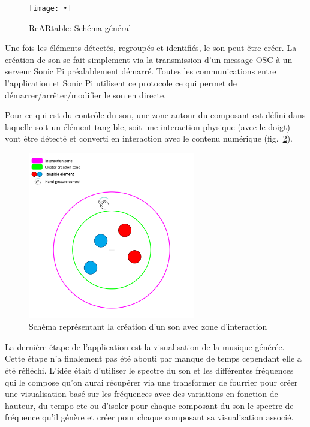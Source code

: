 \begin{figure}[H]
\centering
\caption{ReARtable: Schéma général}
\texttt{[image: •]}
\label{fig:reartable:generalscheme}
\end{figure}

Une fois les éléments détectés, regroupés et identifiés, le son peut être créer. La création de son se fait simplement via la transmission d'un message OSC à un serveur Sonic Pi préalablement démarré. Toutes les communications entre l'application et Sonic Pi utilisent ce protocole ce qui permet de démarrer/arrêter/modifier le son en directe.

Pour ce qui est du contrôle du son, une zone autour du composant est défini dans laquelle soit un élément tangible, soit une interaction physique (avec le doigt) vont être détecté et converti en interaction avec le contenu numérique (fig.~\ref{fig:reartable:interactionzone}).

\begin{figure}[H]
\centering
\includegraphics[width=0.65\textwidth]{images/reartable_cluster_interaction}
\caption{Schéma représentant la création d'un son avec zone d'interaction}
\label{fig:reartable:interactionzone}
\end{figure}

La dernière étape de l'application est la visualisation de la musique générée. Cette étape n'a finalement pas été abouti par manque de temps cependant elle a été réfléchi. L'idée était d'utiliser le spectre du son et les différentes fréquences qui le compose qu'on aurai récupérer via une transformer de fourrier pour créer une visualisation basé sur les fréquences avec des variations en fonction de hauteur, du tempo etc ou d'isoler pour chaque composant du son le spectre de fréquence qu'il génère et créer pour chaque composant sa visualisation associé.

